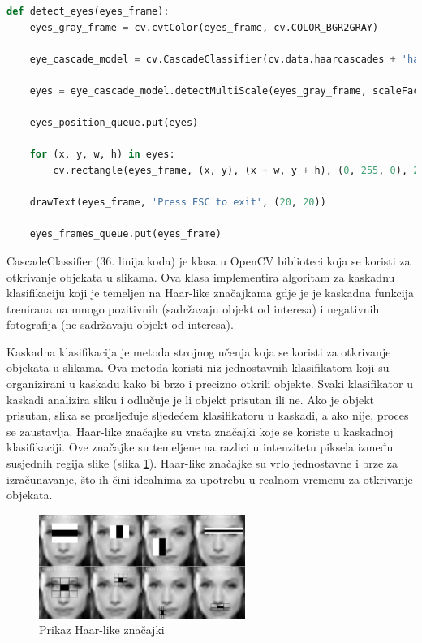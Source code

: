 \documentclass{foi}
\begin{document}
\begin{lstlisting}[language=Python, label={lst:lstlisting_9}, firstnumber=33, style=colored, caption={Definicija funkcije $detect\_eyes()$}]
def detect_eyes(eyes_frame):
    eyes_gray_frame = cv.cvtColor(eyes_frame, cv.COLOR_BGR2GRAY)

    eye_cascade_model = cv.CascadeClassifier(cv.data.haarcascades + 'haarcascade_eye.xml')

    eyes = eye_cascade_model.detectMultiScale(eyes_gray_frame, scaleFactor=1.1, minNeighbors=5, minSize=(30, 30))

    eyes_position_queue.put(eyes)

    for (x, y, w, h) in eyes:
        cv.rectangle(eyes_frame, (x, y), (x + w, y + h), (0, 255, 0), 2)

    drawText(eyes_frame, 'Press ESC to exit', (20, 20))

    eyes_frames_queue.put(eyes_frame)
\end{lstlisting}

CascadeClassifier (36. linija koda) je klasa u OpenCV biblioteci koja se koristi za otkrivanje objekata u slikama. Ova klasa implementira algoritam za kaskadnu klasifikaciju koji je temeljen na Haar-like značajkama gdje je je kaskadna funkcija trenirana na mnogo pozitivnih (sadržavaju objekt od interesa) i negativnih fotografija (ne sadržavaju objekt od interesa). \cite{OpenCV5}

Kaskadna klasifikacija je metoda strojnog učenja koja se koristi za otkrivanje objekata u slikama. Ova metoda koristi niz jednostavnih klasifikatora koji su organizirani u kaskadu kako bi brzo i precizno otkrili objekte. Svaki klasifikator u kaskadi analizira sliku i odlučuje je li objekt prisutan ili ne. Ako je objekt prisutan, slika se prosljeđuje sljedećem klasifikatoru u kaskadi, a ako nije, proces se zaustavlja. Haar-like značajke su vrsta značajki koje se koriste u kaskadnoj klasifikaciji. Ove značajke su temeljene na razlici u intenzitetu piksela između susjednih regija slike (slika \ref{fig:haar_casc}). Haar-like značajke su vrlo jednostavne i brze za izračunavanje, što ih čini idealnima za upotrebu u realnom vremenu za otkrivanje objekata. \cite{KhanTanw2019}

\begin{figure}[h!]
    \centering
    \includegraphics[width=0.6\textwidth]{slike/haar_cascade}
    \caption{Prikaz Haar-like značajki \cite{OpenCV-haar}}
    \label{fig:haar_casc}
\end{figure}
\end{document}
